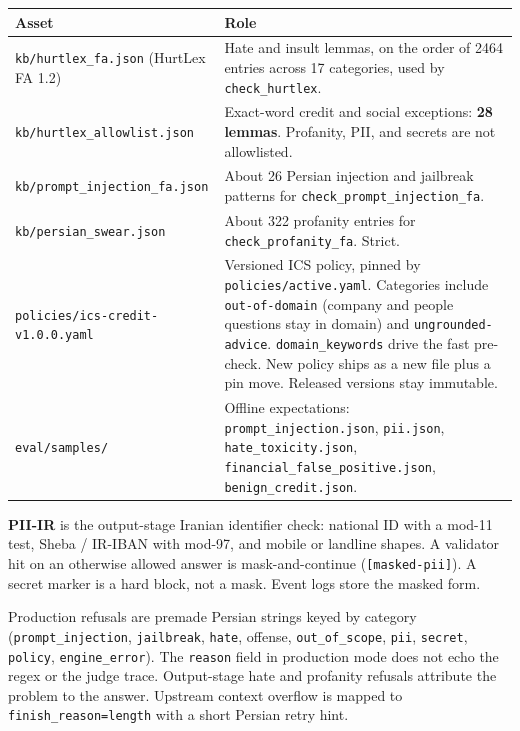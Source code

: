 \begin{longtable}[]{@{}
  >{\raggedright\arraybackslash}p{}
  >{\raggedright\arraybackslash}p{}@{}}
\toprule\noalign{}
Asset & Role \\
\midrule\noalign{}
\endhead
\bottomrule\noalign{}
\endlastfoot
\texttt{kb/hurtlex\_fa.json} (HurtLex FA 1.2) & Hate and insult lemmas, on the order of 2464 entries across 17 categories, used by \texttt{check\_hurtlex}. \\
\texttt{kb/hurtlex\_allowlist.json} & Exact-word credit and social exceptions: \textbf{28 lemmas}. Profanity, PII, and secrets are not allowlisted. \\
\texttt{kb/prompt\_injection\_fa.json} & About 26 Persian injection and jailbreak patterns for \texttt{check\_prompt\_injection\_fa}. \\
\texttt{kb/persian\_swear.json} & About 322 profanity entries for \texttt{check\_profanity\_fa}. Strict. \\
\texttt{policies/ics-credit-v1.0.0.yaml} & Versioned ICS policy, pinned by \texttt{policies/active.yaml}. Categories include \texttt{out-of-domain} (company and people questions stay in domain) and \texttt{ungrounded-advice}. \texttt{domain\_keywords} drive the fast pre-check. New policy ships as a new file plus a pin move. Released versions stay immutable. \\
\texttt{eval/samples/} & Offline expectations: \texttt{prompt\_injection.json}, \texttt{pii.json}, \texttt{hate\_toxicity.json}, \texttt{financial\_false\_positive.json}, \texttt{benign\_credit.json}. \\
\end{longtable}

\textbf{PII-IR} is the output-stage Iranian identifier check: national ID with a mod-11 test, Sheba / IR-IBAN with mod-97, and mobile or landline shapes. A validator hit on an otherwise allowed answer is mask-and-continue (\texttt{{[}masked-pii{]}}). A secret marker is a hard block, not a mask. Event logs store the masked form.

Production refusals are premade Persian strings keyed by category (\texttt{prompt\_injection}, \texttt{jailbreak}, \texttt{hate}, offense, \texttt{out\_of\_scope}, \texttt{pii}, \texttt{secret}, \texttt{policy}, \texttt{engine\_error}). The \texttt{reason} field in production mode does not echo the regex or the judge trace. Output-stage hate and profanity refusals attribute the problem to the answer. Upstream context overflow is mapped to \texttt{finish\_reason=length} with a short Persian retry hint.
